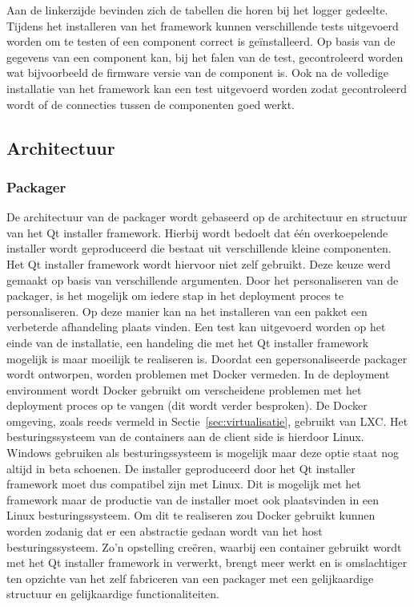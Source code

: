Aan de linkerzijde bevinden zich de tabellen die horen bij het logger gedeelte.
Tijdens het installeren van het framework kunnen verschillende tests uitgevoerd worden om te testen of een component correct is geïnstalleerd.
Op basis van de gegevens van een component kan, bij het falen van de test, gecontroleerd worden wat bijvoorbeeld de firmware versie van de component is.
Ook na de volledige installatie van het framework kan een test uitgevoerd worden zodat gecontroleerd wordt of de connecties tussen de componenten goed werkt.

\subsection{Architectuur}

\subsubsection{Packager}
De architectuur van de packager wordt gebaseerd op de architectuur en structuur van het Qt installer framework.
Hierbij wordt bedoelt dat één overkoepelende installer wordt geproduceerd die bestaat uit verschillende kleine componenten.
Het Qt installer framework wordt hiervoor niet zelf gebruikt.
Deze keuze werd gemaakt op basis van verschillende argumenten.
Door het personaliseren van de packager, is het mogelijk om iedere stap in het deployment proces te personaliseren.
Op deze manier kan na het installeren van een pakket een verbeterde afhandeling plaats vinden.
Een test kan uitgevoerd worden op het einde van de installatie, een handeling die met het Qt installer framework mogelijk is maar moeilijk te realiseren is.
Doordat een gepersonaliseerde packager wordt ontworpen, worden problemen met Docker vermeden.
In de deployment environment wordt Docker gebruikt om verscheidene problemen met het deployment proces op te vangen (dit wordt verder besproken).
De Docker omgeving, zoals reeds vermeld in Sectie~\vref{sec:virtualisatie}, gebruikt van LXC.
Het besturingssysteem van de containers aan de client side is hierdoor Linux.
Windows gebruiken als besturingssysteem is mogelijk maar deze optie staat nog altijd in beta schoenen.
De installer geproduceerd door het Qt installer framework moet dus compatibel zijn met Linux.
Dit is mogelijk met het framework maar de productie van de installer moet ook plaatsvinden in een Linux besturingssysteem.
Om dit te realiseren zou Docker gebruikt kunnen worden zodanig dat er een abstractie gedaan wordt van het host besturingssysteem.
Zo'n opstelling creëren, waarbij een container gebruikt wordt met het Qt installer framework in verwerkt, brengt meer werkt en is omslachtiger ten opzichte van het zelf fabriceren van een packager met een gelijkaardige structuur en gelijkaardige functionaliteiten.

